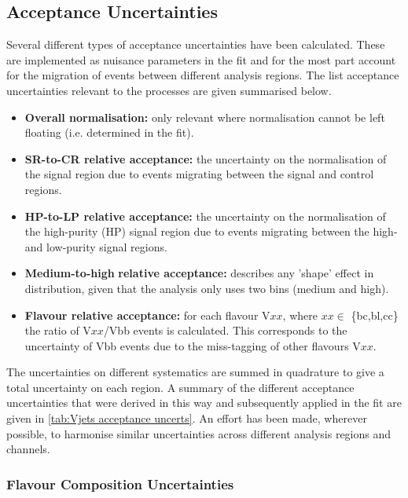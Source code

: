 \subsection{Acceptance Uncertainties}
Several different types of acceptance uncertainties have been calculated. These are implemented as nuisance parameters in the fit and for the most part account for the migration of events between different analysis regions. The list acceptance uncertainties relevant to the \Vjets processes are given summarised below.
%
\begin{itemize}
    \item \textbf{Overall normalisation:} only relevant where normalisation cannot be left floating (i.e. determined in the fit).
    \item \textbf{SR-to-CR relative acceptance:} the uncertainty on the normalisation of the signal region due to events migrating between the signal and control regions.
    \item \textbf{HP-to-LP relative acceptance:} the uncertainty on the normalisation of the high-purity (HP) signal region due to events migrating between the high- and low-purity signal regions.
    \item \textbf{Medium-to-high} \pTV \textbf{relative acceptance:} describes any 'shape' effect in \pTV distribution, given that the analysis only uses two \pTV bins (medium and high).
    \item \textbf{Flavour relative acceptance:} for each flavour V$xx$, where $xx\in$ \{bc,bl,cc\} the ratio of V$xx$/Vbb events is calculated. This corresponds to the uncertainty of Vbb events due to the miss-tagging of other flavours V$xx$. 
\end{itemize}
%
The uncertainties on different systematics are summed in quadrature to give a total uncertainty on each region. A summary of the different acceptance uncertainties that were derived in this way and subsequently applied in the fit are given in \cref{tab:Vjets acceptance uncerts}. An effort has been made, wherever possible, to harmonise similar uncertainties across different analysis regions and channels.


\subsubsection{Flavour Composition Uncertainties}

